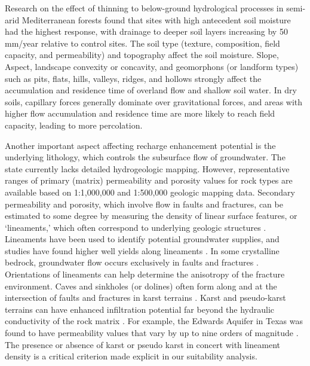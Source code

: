 \documentclass[
  number,
  preprint,
  3p,
  onecolumn]{elsarticle}
\begin{document}
Research on the effect of thinning to below-ground hydrological
processes in semi-arid Mediterranean forests found that sites with high
antecedent soil moisture had the highest response, with drainage to
deeper soil layers increasing by 50 mm/year relative to control
sites\citep{del_campo_effectiveness_2019}. The soil type (texture,
composition, field capacity, and permeability) and topography affect the
soil moisture. Slope, Aspect, landscape convexity or concavity, and
geomorphons (or landform types) such as pits, flats, hills, valleys,
ridges, and hollows strongly affect the accumulation and residence time
of overland flow and shallow soil
water\citep{parker1982, jasiewicz2013}. In dry soils, capillary forces
generally dominate over gravitational forces, and areas with higher flow
accumulation and residence time are more likely to reach field capacity,
leading to more percolation\citep{woessner2020}.

Another important aspect affecting recharge enhancement potential is the
underlying lithology, which controls the subsurface flow of groundwater.
The state currently lacks detailed hydrogeologic mapping. However,
representative ranges of primary (matrix) permeability and porosity
values for rock types are available based on 1:1,000,000 and 1:500,000
geologic mapping data\citep{huscroft2018, freeze1979, woessner2020}.
Secondary permeability and porosity, which involve flow in faults and
fractures, can be estimated to some degree by measuring the density of
linear surface features, or `lineaments,' which often correspond to
underlying geologic structures \citep{oleary1976, sander2007}.
Lineaments have been used to identify potential groundwater supplies,
and studies have found higher well yields along lineaments
\citep{sander2007}. In some crystalline bedrock, groundwater flow occurs
exclusively in faults and fractures \citep{meijerink2007, nyborg2007}.
Orientations of lineaments can help determine the anisotropy of the
fracture environment\citep{meijerink2007}. Caves and sinkholes (or
dolines) often form along and at the intersection of faults and
fractures in karst terrains \citep{ford2007}. Karst and pseudo-karst
terrains can have enhanced infiltration potential far beyond the
hydraulic conductivity of the rock matrix \citep{kresic2013}. For
example, the Edwards Aquifer in Texas was found to have permeability
values that vary by up to nine orders of magnitude \citep{halihan1998}.
The presence or absence of karst or pseudo karst in concert with
lineament density is a critical criterion made explicit in our
suitability analysis.
\end{document}
